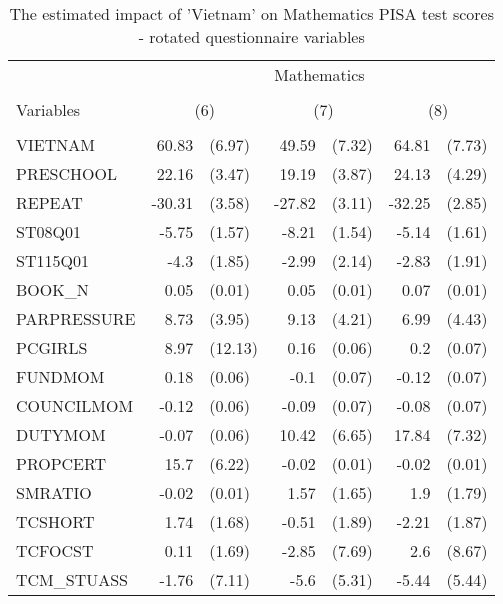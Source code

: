 \documentclass[10pt]{article}
\begin{document}
	
\setcounter{table}{4}
\renewcommand{\thetable}{A\arabic{table}}

	\begin{table}[H]
		\small
		\def\arraystretch{0.7}
		\def\tabcolsep{14}
		\centering
		\captionsetup{justification=centering}
		\caption{The estimated impact of 'Vietnam' on Mathematics PISA test scores - rotated questionnaire variables}
		\begin{threeparttable}
			\begin{tabular}{lrlrlrl}
				\toprule
				\midrule
				& \multicolumn{6}{c}{Mathematics} \\
				\cline{2-7} \\
				Variables & \multicolumn{2}{c}{(6)} & \multicolumn{2}{c}{(7)} & \multicolumn{2}{c}{(8)} \\
				\hline\\  
				VIETNAM & 60.83 & (6.97) & 49.59 & (7.32) & 64.81 & (7.73) \\[0.2em]
				PRESCHOOL & 22.16 & (3.47) & 19.19 & (3.87) & 24.13 & (4.29) \\[0.2em]
				REPEAT & -30.31 & (3.58) & -27.82 & (3.11) & -32.25 & (2.85) \\[0.2em]
				ST08Q01 & -5.75 & (1.57) & -8.21 & (1.54) & -5.14 & (1.61) \\[0.2em]
				ST115Q01 & -4.3  & (1.85) & -2.99 & (2.14) & -2.83 & (1.91) \\[0.2em]
				BOOK\_N & 0.05  & (0.01) & 0.05  & (0.01) & 0.07  & (0.01) \\[0.2em]
				PARPRESSURE & 8.73  & (3.95) & 9.13  & (4.21) & 6.99  & (4.43) \\[0.2em]
				PCGIRLS & 8.97  & (12.13) & 0.16  & (0.06) & 0.2   & (0.07) \\[0.2em]
				FUNDMOM & 0.18  & (0.06) & -0.1  & (0.07) & -0.12 & (0.07) \\[0.2em]
				COUNCILMOM & -0.12 & (0.06) & -0.09 & (0.07) & -0.08 & (0.07) \\[0.2em]
				DUTYMOM & -0.07 & (0.06) & 10.42 & (6.65) & 17.84 & (7.32) \\[0.2em]
				PROPCERT & 15.7  & (6.22) & -0.02 & (0.01) & -0.02 & (0.01) \\[0.2em]
				SMRATIO & -0.02 & (0.01) & 1.57  & (1.65) & 1.9   & (1.79) \\[0.2em]
				TCSHORT & 1.74  & (1.68) & -0.51 & (1.89) & -2.21 & (1.87) \\[0.2em]
				TCFOCST & 0.11  & (1.69) & -2.85 & (7.69) & 2.6   & (8.67) \\[0.2em]
				TCM\_STUASS & -1.76 & (7.11) & -5.6  & (5.31) & -5.44 & (5.44) \\[0.2em]

\end{tabular}
\end{threeparttable}
\end{table}
\end{document}
